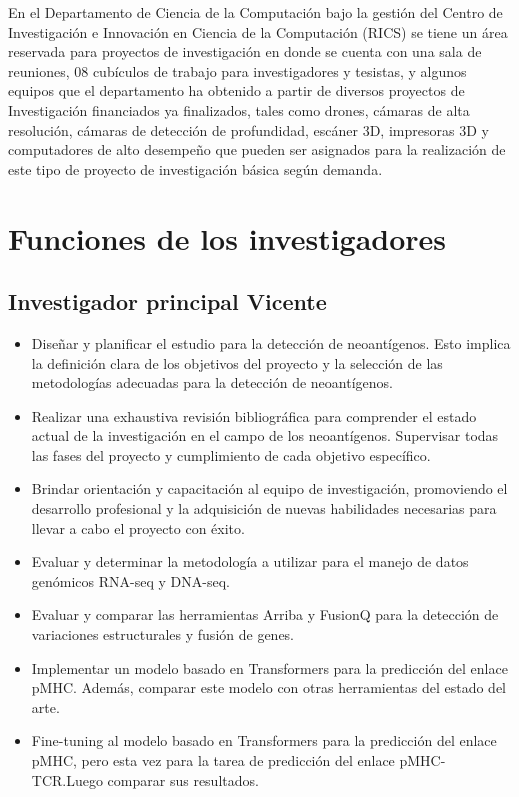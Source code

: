 \documentclass[a4paper,11pt]{article}
\begin{document}
En el Departamento de Ciencia de la Computación bajo la gestión del Centro de Investigación e Innovación en Ciencia de la Computación (RICS) se tiene un área reservada para  proyectos de investigación en donde se cuenta con una sala de reuniones, 08 cubículos de trabajo para investigadores y tesistas, y algunos equipos que el departamento ha obtenido a partir de diversos proyectos de Investigación financiados ya finalizados, tales como drones, cámaras de alta resolución, cámaras de detección de profundidad, escáner 3D, impresoras 3D y computadores de alto desempeño que pueden ser asignados para la realización de este tipo de proyecto de investigación básica según demanda.

\section{Funciones de los investigadores}

\subsection{Investigador principal Vicente}
\begin{itemize}
	 

\item Diseñar y planificar el estudio para la detección de neoantígenos. Esto implica la definición clara de los objetivos del proyecto y la selección de las metodologías adecuadas para la detección de neoantígenos.
\item Realizar una exhaustiva revisión bibliográfica para comprender el estado actual de la investigación en el campo de los neoantígenos. 
Supervisar todas las fases del proyecto y cumplimiento de cada objetivo específico.
\item Brindar orientación y capacitación al equipo de investigación, promoviendo el desarrollo profesional y la adquisición de nuevas habilidades necesarias para llevar a cabo el proyecto con éxito.
\item Evaluar y determinar la metodología a utilizar para el manejo de datos genómicos RNA-seq y DNA-seq.
\item Evaluar y comparar las herramientas Arriba y FusionQ para la detección de variaciones estructurales y fusión de genes.
\item Implementar un modelo basado en Transformers para la predicción del enlace pMHC. Además, comparar este modelo con otras herramientas del estado del arte.
\item Fine-tuning al modelo basado en Transformers para la predicción del enlace pMHC, pero esta vez para la tarea de predicción del enlace pMHC-TCR.Luego comparar sus resultados.
\end{itemize}
\end{document}
